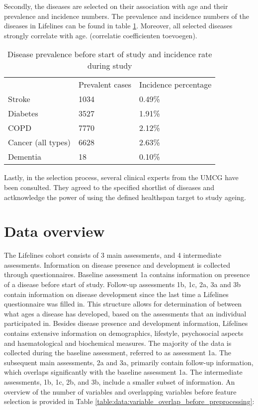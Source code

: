 Secondly, the diseases are selected on their association with age and their prevalence and incidence numbers. The prevalence and incidence numbers of the diseases in Lifelines can be found in table \ref{table:data:disease_prevalence_incidence}. Moreover, all selected diseases strongly correlate with age. (correlatie coefficienten toevoegen).  
\vspace{0.5cm}
\begin{table} [H]
    \centering
    \caption{Disease prevalence before start of study and incidence rate during study}
    \begin{tabular}{lll}
    \cline{1-3}
                       & Prevalent cases & Incidence percentage\\ \cline{1-3}
    Stroke             & 1034            & 0.49\%                   \\
    Diabetes           & 3527            & 1.91\%             \\
    COPD               & 7770            & 2.12\%              \\
    Cancer (all types) & 6628            & 2.63\%              \\
    Dementia           & 18              & 0.10\%             
    \end{tabular}
    \label{table:data:disease_prevalence_incidence}
\end{table} 

Lastly, in the selection process, several clinical experts from the UMCG have been consulted. They agreed to the specified shortlist of diseases and actknowledge the power of using the defined healthspan target to study ageing. 

\section{Data overview}
\label{section:data:data_overview}
The Lifelines cohort consists of 3 main assessments, and 4 intermediate assessments. Information on disease presence and development is collected through questionnaires. Baseline assessment 1a contains information on presence of a disease before start of study. Follow-up assessments 1b, 1c, 2a, 3a and 3b contain information on disease development since the last time a Lifelines questionnaire was filled in. This structure allows for determination of between what ages a disease has developed, based on the assessments that an individual participated in. Besides disease presence and development information, Lifelines contains extensive information on demographics, lifestyle, psychosocial aspects and haematological and biochemical measures. The majority of the data is collected during the baseline assessment, referred to as assessment 1a. The subsequent main assessments, 2a and 3a, primarily contain follow-up information, which overlaps significantly with the baseline assessment 1a. The intermediate assessments, 1b, 1c, 2b, and 3b, include a smaller subset of information. An overview of the number of variables and overlapping variables before feature selection is provided in Table \ref{table:data:variable_overlap_before_preprocessing}: 

